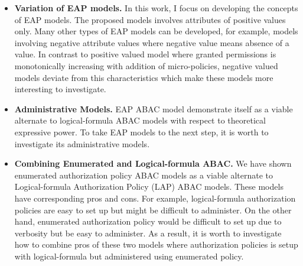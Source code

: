 \begin{itemize}
	
	\item\textbf{ {Variation of EAP models.}} In this work, I focus on developing the concepts of EAP models. The proposed models involves  attributes of positive values only. Many other types of EAP models can be developed, for example, models involving negative attribute values where negative value means absence of a value. In contrast to positive valued model where granted permissions is monotonically increasing with addition of micro-policies, negative valued models deviate from this characteristics which make these models more interesting to investigate.
	
	\item \textbf{{Administrative Models.}} EAP ABAC model demonstrate itself as a viable alternate to logical-formula ABAC models with respect to theoretical expressive power. To take EAP  models to the next step, it is worth to investigate its administrative models.
	
	\item \textbf{ Combining Enumerated and Logical-formula ABAC.} We have shown enumerated authorization policy ABAC models as a viable alternate to Logical-formula Authorization Policy (LAP) ABAC models. These models have corresponding pros and cons. For example, logical-formula authorization policies are easy to set up but might be difficult to administer. On the other hand, enumerated authorization policy would be difficult to set up due to verbosity but be easy to administer. As a result, it is worth to investigate how to combine pros of these two models where authorization policies is setup with logical-formula but administered using enumerated policy. 	
\end{itemize}

 